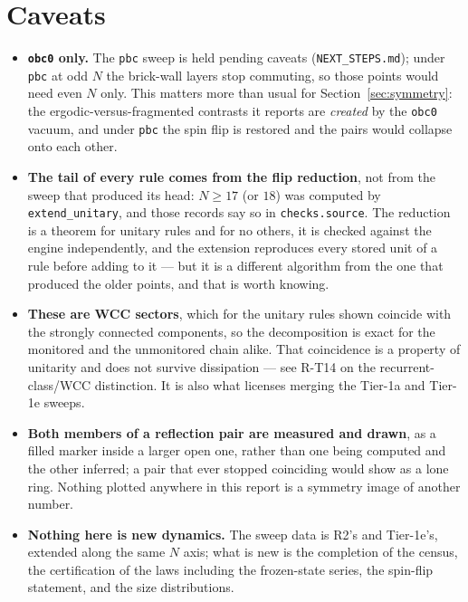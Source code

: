 \documentclass[11pt]{article}
\newcommand{\rt}[1]{\texttt{#1}}
\newcommand{\fn}[1]{\texttt{#1}}
\begin{document}
\section{Caveats}

\begin{itemize}
  \item \textbf{\rt{obc0} only.} The \rt{pbc} sweep is held pending caveats
    (\fn{NEXT\_STEPS.md}); under \rt{pbc} at odd $N$ the brick-wall layers stop
    commuting, so those points would need even $N$ only. This matters more than
    usual for Section~\ref{sec:symmetry}: the ergodic-versus-fragmented contrasts
    it reports are \emph{created} by the \rt{obc0} vacuum, and under \rt{pbc} the
    spin flip is restored and the pairs would collapse onto each other.
  \item \textbf{The tail of every rule comes from the flip reduction}, not from
    the sweep that produced its head: $N \ge 17$ (or $18$) was computed by
    \fn{extend\_unitary}, and those records say so in \rt{checks.source}. The
    reduction is a theorem for unitary rules and for no others, it is checked
    against the engine independently, and the extension reproduces every stored
    unit of a rule before adding to it --- but it is a different algorithm from
    the one that produced the older points, and that is worth knowing.
  \item \textbf{These are WCC sectors}, which for the unitary rules shown
    coincide with the strongly connected components, so the decomposition is
    exact for the monitored and the unmonitored chain alike. That coincidence is
    a property of unitarity and does not survive dissipation --- see R-T14 on
    the recurrent-class/WCC distinction. It is also what licenses merging the
    Tier-1a and Tier-1e sweeps.
  \item \textbf{Both members of a reflection pair are measured and drawn}, as a
    filled marker inside a larger open one, rather than one being computed and
    the other inferred; a pair that ever stopped coinciding would show as a lone
    ring. Nothing plotted anywhere in this report is a symmetry image of another
    number.
  \item \textbf{Nothing here is new dynamics.} The sweep data is R2's and
    Tier-1e's, extended along the same $N$ axis; what is new is the completion of
    the census, the certification of the laws including the frozen-state series,
    the spin-flip statement, and the size distributions.
\end{itemize}
\end{document}
